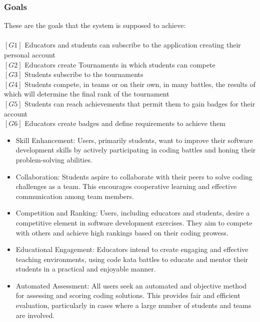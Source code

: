 \documentclass{article}
\begin{document}
\subsubsection{Goals}
These are the goals that the system is supposed to achieve:\\\\
$[G1]$ Educators and students can subscribe to the application creating their personal account \\
$[G2]$ Educators create Tournaments in which students can compete \\
$[G3]$ Students subscribe to the tournaments \\
$[G4]$ Students compete, in teams or on their own, in many battles, the results of which will determine the final rank of the tournament  \\
$[G5]$ Students can reach achievements that permit them to gain badges for their account \\
$[G6]$ Educators create badges and define requirements to achieve them \\
\begin{itemize}
\item Skill Enhancement: Users, primarily students, want to improve their software development skills by actively participating in coding battles and honing their problem-solving abilities. 

\item Collaboration: Students aspire to collaborate with their peers to solve coding challenges as a team. This encourages cooperative learning and effective communication among team members.

\item Competition and Ranking: Users, including educators and students, desire a competitive element in software development exercises. They aim to compete with others and achieve high rankings based on their coding prowess.

\item Educational Engagement: Educators intend to create engaging and effective teaching environments, using code kata battles to educate and mentor their students in a practical and enjoyable manner.

\item Automated Assessment: All users seek an automated and objective method for assessing and scoring coding solutions. This provides fair and efficient evaluation, particularly in cases where a large number of students and teams are involved.

\end{itemize}
\newpage
\end{document}
